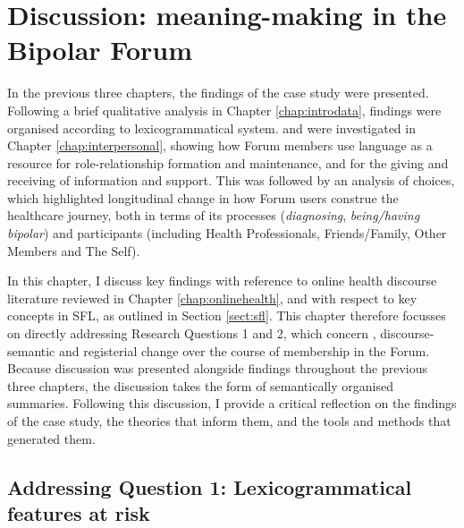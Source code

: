 
\chapter{Discussion: meaning-making in the Bipolar Forum} \label{chap:discuss-bp}

In the previous three chapters, the findings of the case study were presented. Following a brief qualitative analysis in Chapter \ref{chap:introdata}, findings were organised according to lexicogrammatical system.  and  were investigated in Chapter \ref{chap:interpersonal}, showing how \Gls{Forum} \glspl{member} use language as a resource for role\hyp{}relationship formation and maintenance, and for the giving and receiving of information and support. This was followed by an analysis of  choices, which highlighted longitudinal change in how \gls{Forum} users construe the healthcare journey, both in terms of its processes (\emph{diagnosing}, \emph{being\slash having bipolar}) and participants (including Health Professionals, Friends\slash Family, Other Members and The Self).

In this chapter, I discuss key findings with reference to online health discourse literature reviewed in Chapter \ref{chap:onlinehealth}, and with respect to key concepts in \gls{SFL}, as outlined in Section \ref{sect:sfl}. This chapter therefore focusses on directly addressing Research Questions 1 and 2, which concern , \gls{discourse-semantic} and registerial change over the course of membership in the \gls{Forum}. Because discussion was presented alongside findings throughout the previous three chapters, the discussion takes the form of semantically organised summaries. Following this discussion, I provide a critical reflection on the findings of the case study, the theories that inform them, and the tools and methods that generated them.

\section{Addressing Question 1: Lexicogrammatical features at risk}

